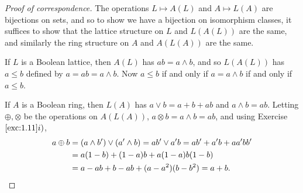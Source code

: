 \documentclass[12pt,letterpaper]{article}
\theoremstyle{definition}
\theoremstyle{remark}
\numberwithin{figure}{problem}
\numberwithin{equation}{section}
\begin{document}
\begin{proof}[Proof of correspondence]
  The operations
  $L \mapsto
  A(L)$ and
  $A \mapsto
  L(A)$ are bijections on sets, and so to show we have a bijection on isomorphism classes, it suffices to show that the lattice structure on
  $L$ and
  $L(A(L))$ are the same, and similarly the ring structure on
  $A$ and
  $A(L(A))$ are the same.
  \par If
  $L$ is a Boolean lattice, then
  $A(L)$ has
  $ab = a \land
  b$, and so
  $L(A(L))$ has
  $a \leqslant
  b$ defined by
  $a = ab = a \land
  b$.
  Now
  $a \leqslant
  b$ if and only if
  $a = a \land
  b$ if and only if
  $a \le
  b$.
  \par If
  $A$ is a Boolean ring, then
  $L(A)$ has
  $a \lor b = a + b +
  ab$ and
  $a \land b =
  ab$.
  Letting
  $\oplus,\otimes$ be the operations on
  $A(L(A))$,
  $a \otimes b = a \land b =
  ab$, and using Exercise
  $\ref{exc:1.11}i)$,
  \begin{align*}
    a \oplus b &%
    = (a \land b') \lor (a' \land b) = ab' \lor a'b = ab' + a'b + aa'bb'\\
    &%
    = a(1-b) + (1-a)b + a(1-a)b(1-b)\\
    &%
    = a - ab + b - ab + (a-a^2)(b-b^2) = a + b.\qedhere
  \end{align*}
\end{proof}
\end{document}
